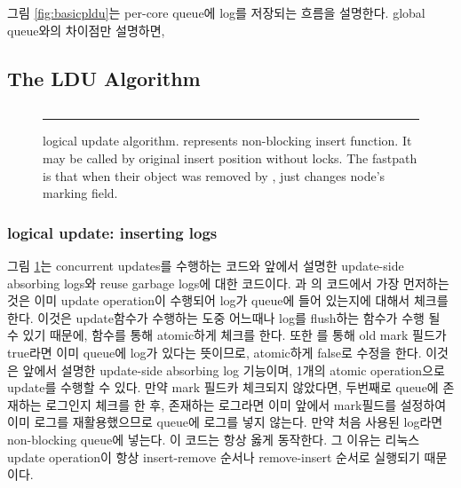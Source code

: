 그림 \ref{fig:basicpldu}는 per-core queue에 log를 저장되는 흐름을 설명한다.
global queue와의 차이점만 설명하면,


\else

\fi

\subsection{The LDU Algorithm}
\begin{figure}[tb!]
\inputminted[linenos,fontsize=\footnotesize, tabsize=2]{c}{src/ldu_logical.c}
\rule{\columnwidth}{0.5pt}
\vspace{-\baselineskip}
\caption{ logical update algorithm.  represents
 non-blocking insert function.
It may be called by original insert position without locks. The fastpath is
 that when their object was removed by ,
  just changes node's marking field.}
\label{fig:gldulogicalupdate}
\end{figure}

\subsubsection{logical update: inserting logs}
\ifkor

그림 \ref{fig:gldulogicalupdate}는 concurrent updates를 수행하는 코드와 앞에서 설명한 update-side
absorbing logs와 reuse garbage logs에 대한 코드이다. 과
의 코드에서 가장 먼저하는 것은 이미 update operation이 수행되어 log가 queue에 들어
있는지에 대해서 체크를 한다. 이것은 update함수가 수행하는 도중 어느때나 log를 flush하는  함수가
수행 될 수 있기 때문에,  함수를 통해 atomic하게 체크를 한다. 또한 를 통해 old mark
필드가 true라면 이미 queue에 log가 있다는 뜻이므로, atomic하게 false로 수정을 한다.
이것은 앞에서 설명한 update-side absorbing log 기능이며, 1개의 atomic operation으로 update를 수행할 수
있다.
만약 mark 필드카 체크되지 않았다면, 두번째로 queue에 존재하는 로그인지 체크를 한 후, 존재하는 로그라면
이미 앞에서 mark필드를 설정하여 이미 로그를 재활용했으므로 queue에 로그를 넣지 않는다.
만약 처음 사용된 log라면 non-blocking queue에 넣는다.
이 코드는 항상 옳게 동작한다.  
그 이유는 리눅스 update operation이 항상 insert-remove 순서나 remove-insert 순서로 실행되기 때문이다.
\else

